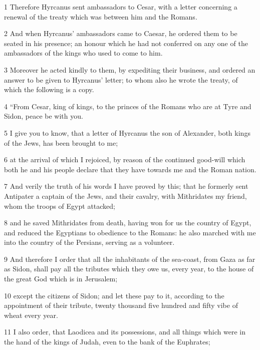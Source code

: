 \par 1 Therefore Hyrcanus sent ambassadors to Cesar, with a letter concerning a renewal of the treaty which was between him and the Romans. 

\par 2 And when Hyrcanus’ ambassadors came to Caesar, he ordered them to be seated in his presence; an honour which he had not conferred on any one of the ambassadors of the kings who used to come to him. 

\par 3 Moreover he acted kindly to them, by expediting their business, and ordered an answer to be given to Hyrcanus’ letter; to whom also he wrote the treaty, of which the following is a copy. 

\par 4 “From Cesar, king of kings, to the princes of the Romans who are at Tyre and Sidon, peace be with you. 

\par 5 I give you to know, that a letter of Hyrcanus the son of Alexander, both kings of the Jews, has been brought to me; 

\par 6 at the arrival of which I rejoiced, by reason of the continued good-will which both he and his people declare that they have towards me and the Roman nation. 

\par 7 And verily the truth of his words I have proved by this; that he formerly sent Antipater a captain of the Jews, and their cavalry, with Mithridates my friend, whom the troops of Egypt attacked; 

\par 8 and he saved Mithridates from death, having won for us the country of Egypt, and reduced the Egyptians to obedience to the Romans: he also marched with me into the country of the Persians, serving as a volunteer. 

\par 9 And therefore I order that all the inhabitants of the sea-coast, from Gaza as far as Sidon, shall pay all the tributes which they owe us, every year, to the house of the great God which is in Jerusalem; 

\par 10 except the citizens of Sidon; and let these pay to it, according to the appointment of their tribute, twenty thousand five hundred and fifty vibe of wheat every year. 

\par 11 I also order, that Laodicea and its possessions, and all things which were in the hand of the kings of Judah, even to the bank of the Euphrates; 

